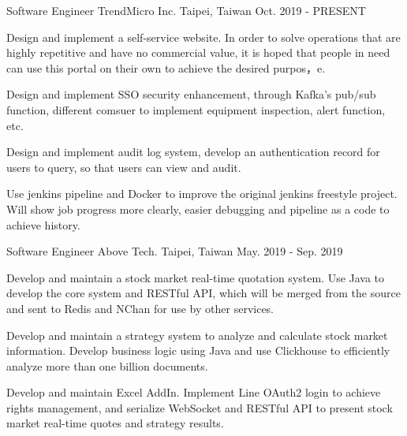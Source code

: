 

\begin{cventries}

\cventry
{Software Engineer} %
{TrendMicro Inc.} %
{Taipei, Taiwan} %
{Oct. 2019 - PRESENT} %
{
  \begin{cvitems} %
    \item {Design and implement a self-service website. In order to solve operations that are highly repetitive and have no commercial value, it is hoped that people in need can use this portal on their own to achieve the desired purpos，e.}
    \item {Design and implement SSO security enhancement, through Kafka's pub/sub function, different comsuer to implement equipment inspection, alert function, etc.}
    \item {Design and implement audit log system, develop an authentication record for users to query, so that users can view and audit.}
    \item {Use jenkins pipeline and Docker to improve the original jenkins freestyle project. Will show job progress more clearly, easier debugging and pipeline as a code to achieve history.}
  \end{cvitems}
}

\cventry
{Software Engineer} %
{Above Tech.} %
{Taipei, Taiwan} %
{May. 2019 - Sep. 2019} %
{
  \begin{cvitems} %
    \item {Develop and maintain a stock market real-time quotation system. Use Java to develop the core system and RESTful API, which will be merged from the source and sent to Redis and NChan for use by other services.}
    \item {Develop and maintain a strategy system to analyze and calculate stock market information. Develop business logic using Java and use Clickhouse to efficiently analyze more than one billion documents.}
    \item {Develop and maintain Excel AddIn. Implement Line OAuth2 login to achieve rights management, and serialize WebSocket and RESTful API to present stock market real-time quotes and strategy results.}
  \end{cvitems}
}


\end{cventries}

